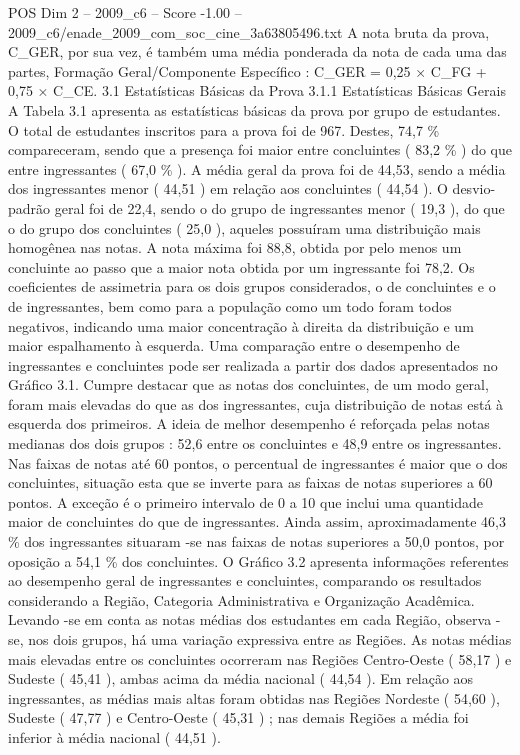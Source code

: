 \begin{textsample}{POS Dim 2 – 2009\_c6 – Score -1.00 – 2009\_c6/enade\_2009\_com\_soc\_cine\_3a63805496.txt}
A nota bruta da prova, C\_GER, por sua vez, é também uma média ponderada da nota de cada uma das partes, Formação Geral/Componente Específico : C\_GER = 0,25 × C\_FG + 0,75 × C\_CE. 3.1 Estatísticas Básicas da Prova 3.1.1 Estatísticas Básicas Gerais A Tabela 3.1 apresenta as estatísticas básicas da prova por grupo de estudantes.
O total de estudantes inscritos para a prova foi de 967.
Destes, 74,7 \% compareceram, sendo que a presença foi maior entre concluintes ( 83,2 \% ) do que entre ingressantes ( 67,0 \% ).
A média geral da prova foi de 44,53, sendo a média dos ingressantes menor ( 44,51 ) em relação aos concluintes ( 44,54 ).
O desvio-padrão geral foi de 22,4, sendo o do grupo de ingressantes menor ( 19,3 ), do que o do grupo dos concluintes ( 25,0 ), aqueles possuíram uma distribuição mais homogênea nas notas.
A nota máxima foi 88,8, obtida por pelo menos um concluinte ao passo que a maior nota obtida por um ingressante foi 78,2.
Os coeficientes de assimetria para os dois grupos considerados, o de concluintes e o de ingressantes, bem como para a população como um todo foram todos negativos, indicando uma maior concentração à direita da distribuição e um maior espalhamento à esquerda.
Uma comparação entre o desempenho de ingressantes e concluintes pode ser realizada a partir dos dados apresentados no Gráfico 3.1.
Cumpre destacar que as notas dos concluintes, de um modo geral, foram mais elevadas do que as dos ingressantes, cuja distribuição de notas está à esquerda dos primeiros.
A ideia de melhor desempenho é reforçada pelas notas medianas dos dois grupos : 52,6 entre os concluintes e 48,9 entre os ingressantes.
Nas faixas de notas até 60 pontos, o percentual de ingressantes é maior que o dos concluintes, situação esta que se inverte para as faixas de notas superiores a 60 pontos.
A exceção é o primeiro intervalo de 0 a 10 que inclui uma quantidade maior de concluintes do que de ingressantes.
Ainda assim, aproximadamente 46,3 \% dos ingressantes situaram -se nas faixas de notas superiores a 50,0 pontos, por oposição a 54,1 \% dos concluintes.
O Gráfico 3.2 apresenta informações referentes ao desempenho geral de ingressantes e concluintes, comparando os resultados considerando a Região, Categoria Administrativa e Organização Acadêmica.
Levando -se em conta as notas médias dos estudantes em cada Região, observa -se, nos dois grupos, há uma variação expressiva entre as Regiões.
As notas médias mais elevadas entre os concluintes ocorreram nas Regiões Centro-Oeste ( 58,17 ) e Sudeste ( 45,41 ), ambas acima da média nacional ( 44,54 ).
Em relação aos ingressantes, as médias mais altas foram obtidas nas Regiões Nordeste ( 54,60 ), Sudeste ( 47,77 ) e Centro-Oeste ( 45,31 ) ; nas demais Regiões a média foi inferior à média nacional ( 44,51 ).

\end{textsample}
